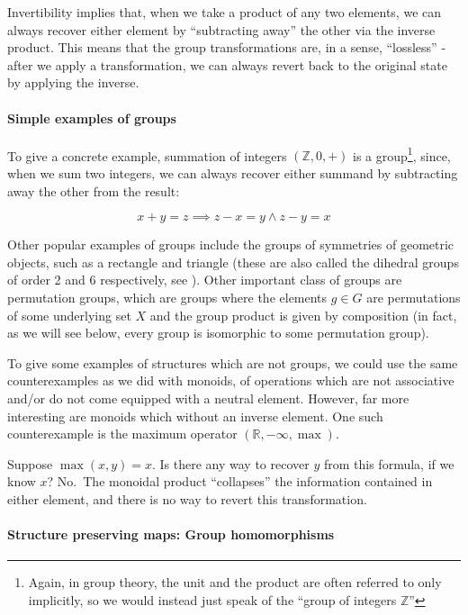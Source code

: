 \documentclass[
  openany]{book}
\theoremstyle{definition}
\theoremstyle{definition}
\theoremstyle{definition}
\theoremstyle{definition}
\theoremstyle{remark}
\begin{document}
Invertibility implies that, when we take a product of any two elements, we can always recover either element by ``subtracting away'' the other via the inverse product. This means that the group transformations are, in a sense, ``lossless'' - after we apply a transformation, we can always revert back to the original state by applying the inverse.

\paragraph{Simple examples of groups}\label{simple-examples-of-groups}

To give a concrete example, summation of integers \((\mathbb{Z}, 0, +)\) is a group\footnote{Again, in group theory, the unit and the product are often referred to only implicitly, so we would instead just speak of the ``group of integers \(\mathbb{Z}\)''}, since, when we sum two integers, we can always recover either summand by subtracting away the other from the result:

\[x + y = z \implies z - x = y \wedge z - y = x\]

Other popular examples of groups include the groups of symmetries of geometric objects, such as a rectangle and triangle (these are also called the dihedral groups of order 2 and 6 respectively, see ). Other important class of groups are permutation groups, which are groups where the elements \(g \in G\) are permutations of some underlying set \(X\) and the group product is given by composition (in fact, as we will see below, every group is isomorphic to some permutation group).

To give some examples of structures which are not groups, we could use the same counterexamples as we did with monoids, of operations which are not associative and/or do not come equipped with a neutral element. However, far more interesting are monoids which without an inverse element. One such counterexample is the maximum operator \((\mathbb{R}, -\infty, \max)\).

Suppose \(\max(x, y) = x\). Is there any way to recover \(y\) from this formula, if we know \(x\)? No.~The monoidal product ``collapses'' the information contained in either element, and there is no way to revert this transformation.

\paragraph{Structure preserving maps: Group homomorphisms}\label{group-homomorphism}
\end{document}
